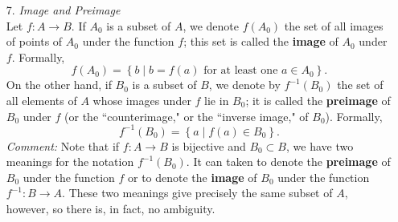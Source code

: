 \begin{enumerate}
\begin{enumerate}
        \item[d).] Given that $f:A \longrightarrow B$ and $g: B\longrightarrow C$:
            \begin{itemize}
                \item If $g \circ f$ is injective then $f$ is injective.
                \item If $g \circ f$ is surjective then $g$ is surjective.
            \end{itemize}
            so if $g \circ f$ is bijective then $f$ is injective and $g$ is onto, but the converse is not true.
            \begin{proof} The two bullet points and the comment:
                \begin{itemize}
                    \item $f(x) = f(x') \implies g\left(f(x)\right) = g\left(f(x')\right) \implies \left(g \circ f\right)(x) = \left(g \circ f\right)(x') \implies x = x'$
                    \item If $c \in C$ then $\exists\, a$ such that
                    $$\left(a \in A \land \left(g \circ f\right)(a) = c\right) \implies \left(a' \in A \land g \left(f(a')\right) = c\right)$$
                    Consider $b = f(a) \in B$ then $g(b) = c.$
                    \end{itemize}
            Now take $A = \{1, 2\}, \,B = \{3, 4, 5\}\, C = \{6, 7\}$ and 
            $$f(1)= 3, f(2) = 4; g(3) = g(4) = 6, g(5) = 7$$
            $f$ is injective and $g$ is onto but 
            $$\left(g \circ f\right)(1) = \left(g \circ f\right)(2) = 6$$
            which means that $g\circ f$ is not a bijective map.
            \end{proof}
    \end{enumerate}
    \item[7.] \emph{Image and Preimage}\\
        Let $f: A \longrightarrow B$. If $A_0$ is a subset of $A$, we denote $f(A_0)$ the set of all images of points of $A_0$ under the function $f$; this set is called the {\bf image} of $A_0$ under $f$. Formally,
        $$f(A_0) = \left\{b \mid b = f(a) \text{ for at least one $a \in A_0$}\right\}.$$
        On the other hand, if $B_0$ is a subset of $B$, we denote by $f^{-1}(B_0)$ the set of all elements of $A$ whose images under $f$ lie in $B_0$; it is called the {\bf preimage} of $B_0$ under $f$ (or the ``counterimage," or the ``inverse image," of $B_0$). Formally,
        $$f^{-1}\left(B_0\right) = \left\{a \mid f(a) \in B_0\right\}.$$
        \emph{Comment:} Note that if $f: A \longrightarrow B$ is bijective and $B_0 \subset B$, we have two meanings for the notation $f^{-1}\left(B_0\right)$. It can taken to denote the {\bf preimage} of $B_0$ under the function $f$ or to denote the {\bf image} of $B_0$ under the function $f^{-1}: B \longrightarrow A$. These two meanings give precisely the same subset of $A$, however, so there  is, in fact, no ambiguity.

\end{enumerate}
